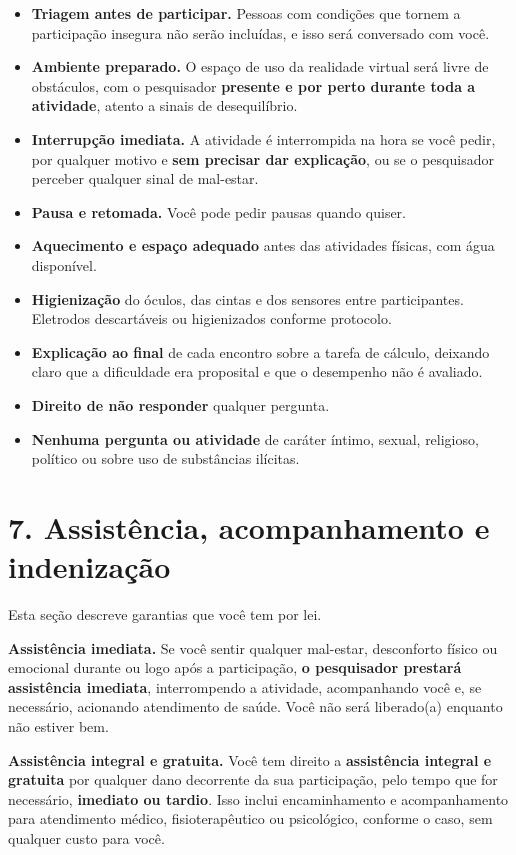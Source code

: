 \documentclass[12pt,a4paper]{article}
\begin{document}
\begin{itemize}
  \item \textbf{Triagem antes de participar.} Pessoas com condições que tornem a participação insegura não serão incluídas, e isso será conversado com você.
  \item \textbf{Ambiente preparado.} O espaço de uso da realidade virtual será livre de obstáculos, com o pesquisador \textbf{presente e por perto durante toda a atividade}, atento a sinais de desequilíbrio.
  \item \textbf{Interrupção imediata.} A atividade é interrompida na hora se você pedir, por qualquer motivo e \textbf{sem precisar dar explicação}, ou se o pesquisador perceber qualquer sinal de mal-estar.
  \item \textbf{Pausa e retomada.} Você pode pedir pausas quando quiser.
  \item \textbf{Aquecimento e espaço adequado} antes das atividades físicas, com água disponível.
  \item \textbf{Higienização} do óculos, das cintas e dos sensores entre participantes. Eletrodos descartáveis ou higienizados conforme protocolo.
  \item \textbf{Explicação ao final} de cada encontro sobre a tarefa de cálculo, deixando claro que a dificuldade era proposital e que o desempenho não é avaliado.
  \item \textbf{Direito de não responder} qualquer pergunta.
  \item \textbf{Nenhuma pergunta ou atividade} de caráter íntimo, sexual, religioso, político ou sobre uso de substâncias ilícitas.
\end{itemize}

\section*{7. Assistência, acompanhamento e indenização}

Esta seção descreve garantias que você tem por lei.

\textbf{Assistência imediata.} Se você sentir qualquer mal-estar, desconforto
físico ou emocional durante ou logo após a participação, \textbf{o pesquisador
prestará assistência imediata}, interrompendo a atividade, acompanhando você e,
se necessário, acionando atendimento de saúde. Você não será liberado(a)
enquanto não estiver bem.

\textbf{Assistência integral e gratuita.} Você tem direito a \textbf{assistência
integral e gratuita} por qualquer dano decorrente da sua participação, pelo tempo
que for necessário, \textbf{imediato ou tardio}. Isso inclui encaminhamento e
acompanhamento para atendimento médico, fisioterapêutico ou psicológico,
conforme o caso, sem qualquer custo para você.
\end{document}
